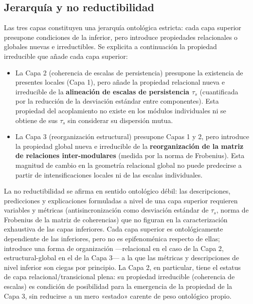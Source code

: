 \subsection{Jerarquía y no reductibilidad}

Las tres capas constituyen una jerarquía ontológica estricta: cada capa superior presupone condiciones de la inferior, pero introduce propiedades relacionales o globales nuevas e irreductibles. Se explicita a continuación la propiedad irreducible que añade cada capa superior:

\begin{itemize}
    \item La Capa 2 (coherencia de escalas de persistencia) presupone la existencia de presentes locales (Capa 1), pero añade la propiedad relacional nueva e irreducible de la \textbf{alineación de escalas de persistencia $\tau_s$} (cuantificada por la reducción de la desviación estándar entre componentes). Esta propiedad del acoplamiento no existe en los módulos individuales ni se obtiene de sus $\tau_s$ sin considerar su dispersión mutua.
    \item La Capa 3 (reorganización estructural) presupone Capas 1 y 2, pero introduce la propiedad global nueva e irreducible de la \textbf{reorganización de la matriz de relaciones inter-modulares} (medida por la norma de Frobenius). Esta magnitud de cambio en la geometría relacional global no puede predecirse a partir de intensificaciones locales ni de las escalas individuales.
\end{itemize}

La no reductibilidad se afirma en sentido ontológico débil: las descripciones, predicciones y explicaciones formuladas a nivel de una capa superior requieren variables y métricas (antisincronización como desviación estándar de $\tau_s$, norma de Frobenius de la matriz de coherencias) que no figuran en la caracterización exhaustiva de las capas inferiores. Cada capa superior es ontológicamente dependiente de las inferiores, pero no es epifenoménica respecto de ellas; introduce una forma de organización —relacional en el caso de la Capa 2, estructural-global en el de la Capa 3— a la que las métricas y descripciones de nivel inferior son ciegas por principio. La Capa 2, en particular, tiene el estatus de capa relacional/transicional plena: su propiedad irreducible (coherencia de escalas) es condición de posibilidad para la emergencia de la propiedad de la Capa 3, sin reducirse a un mero «estado» carente de peso ontológico propio.

